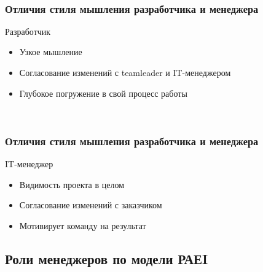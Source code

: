 \documentclass{../industrial-development}
\begin{document}
~\cite{How_to_be_a_good_IT-manager}

\begin{frame} \frametitle{Отличия стиля мышления разработчика и менеджера}
	\begin{block}{Разработчик}
\begin{itemize}
\item Узкое мышление
\item Согласование изменений с teamleader и IT-менеджером
\item Глубокое погружение в свой процесс работы
\end{itemize}
\end{block}
\end{frame}
\lecturenotes

~\cite{How_to_be_a_good_IT-manager}

\begin{frame} \frametitle{Отличия стиля мышления разработчика и менеджера}
	\begin{block}{IT-менеджер}
\begin{itemize}
\item Видимость проекта в целом
\item Согласование изменений с заказчиком 
\item Мотивирует команду на результат
\end{itemize}
\end{block}
\end{frame}
\lecturenotes

\subsection{Роли менеджеров по модели РАЕI}
\end{document}
